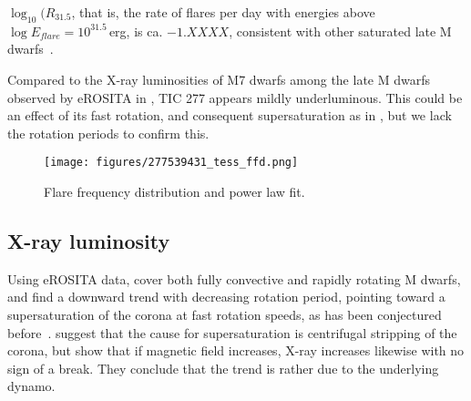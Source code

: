\documentclass[twocolumn]{aastex631}
\begin{document}
$\log_10(R_{31.5}$, that is, the rate of flares per day with energies above $\log E_{flare}=10^{31.5}\,$erg, is ca. $-1.XXXX$, consistent with other saturated late M dwarfs~\citep{medina2022galactic}.

Compared to the X-ray luminosities of M7 dwarfs among the late M dwarfs observed by eROSITA in \citet{stelzer2022first}, TIC 277 appears mildly underluminous. This could be an effect of its fast rotation, and consequent supersaturation as in \citet{magaudda2022first}, but we lack the rotation periods to confirm this. 

\begin{figure}
    \begin{centering}
        \texttt{[image: figures/277539431\_tess\_ffd.png]}
        \caption{
         Flare frequency distribution and power law fit.
        }
        \label{fig:ffd}
    \end{centering}
\end{figure}




\subsection{X-ray luminosity}
\label{sec:discussion:xraylum}




Using eROSITA data, \citet{magaudda2022first} cover both fully convective and rapidly rotating M dwarfs, and find a downward trend with decreasing rotation period, pointing toward a supersaturation of the corona at fast rotation speeds, as has been conjectured before~\citep{jeffries2011investigating,ramsay2020tess}. \citet{jeffries2011investigating} suggest that the cause for supersaturation is centrifugal stripping of the corona, but \citet{reiners2022magnetism} show that if magnetic field increases, X-ray increases likewise with no sign of a break. They conclude that the trend is rather due to the underlying dynamo.
\end{document}
